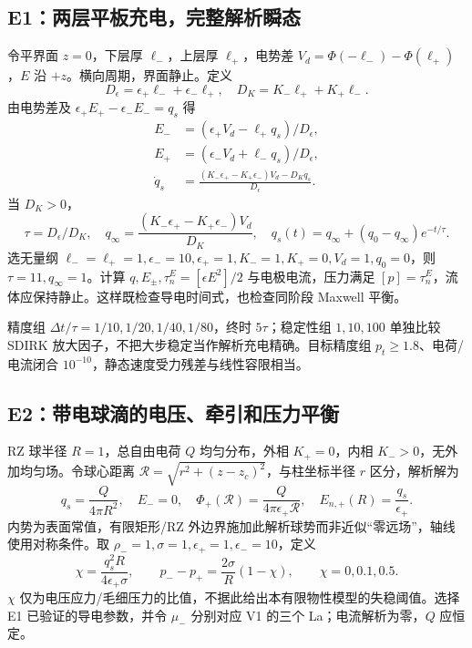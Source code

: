 \documentclass[UTF8,a4paper,11pt,fontset=fandol]{ctexart}
\numberwithin{equation}{section}
\newcommand{\dt}{\Delta t}\newcommand{\dd}{\,\mathrm d}
\begin{document}
\subsection{E1：两层平板充电，完整解析瞬态}
令平界面 $z=0$，下层厚 $\ell_-$，上层厚 $\ell_+$，电势差 $V_d=\Phi(-\ell_-)-\Phi(\ell_+)$，$E$ 沿 $+z$。横向周期，界面静止。定义
\begin{equation}
 D_\epsilon=\epsilon_+\ell_-+\epsilon_-\ell_+,
 \quad D_K=K_-\ell_++K_+\ell_-.
\end{equation}
由电势差及 $\epsilon_+E_+-\epsilon_-E_-=q_s$ 得
\begin{align}
 E_-&=(\epsilon_+V_d-\ell_+q_s)/D_\epsilon,\\
 E_+&=(\epsilon_-V_d+\ell_-q_s)/D_\epsilon,\\
 \dot q_s&=\frac{(K_-\epsilon_+-K_+\epsilon_-)V_d-D_Kq_s}{D_\epsilon}.
\end{align}
当 $D_K>0$，
\begin{equation}
 \tau=D_\epsilon/D_K,\quad
 q_\infty=\frac{(K_-\epsilon_+-K_+\epsilon_-)V_d}{D_K},\quad
 q_s(t)=q_\infty+(q_0-q_\infty)e^{-t/\tau}.
\end{equation}
选无量纲 $\ell_-=\ell_+=1,\epsilon_-=10,\epsilon_+=1,K_-=1,K_+=0,V_d=1,q_0=0$，则 $\tau=11,q_\infty=1$。计算 $q,E_\pm,\tau_n^E=[\epsilon E^2]/2$ 与电极电流，压力满足 $[p]=\tau_n^E$，流体应保持静止。这样既检查导电时间式，也检查同阶段 Maxwell 平衡。

精度组 $\dt/\tau=1/10,1/20,1/40,1/80$，终时 $5\tau$；稳定性组 $1,10,100$ 单独比较 SDIRK 放大因子，不把大步稳定当作解析充电精确。目标精度组 $p_t\ge1.8$、电荷/电流闭合 $10^{-10}$，静态速度受力残差与线性容限相当。

\subsection{E2：带电球滴的电压、牵引和压力平衡}
RZ 球半径 $R=1$，总自由电荷 $Q$ 均匀分布，外相 $K_+=0$，内相 $K_->0$，无外加均匀场。令球心距离 $\mathcal R=\sqrt{r^2+(z-z_c)^2}$，与柱坐标半径 $r$ 区分，解析解为
\begin{equation}
 q_s=\frac{Q}{4\pi R^2},\quad E_-=0,\quad
 \Phi_+(\mathcal R)=\frac{Q}{4\pi\epsilon_+\mathcal R},\quad
 E_{n,+}(R)=\frac{q_s}{\epsilon_+}.
\end{equation}
内势为表面常值，有限矩形/RZ 外边界施加此解析球势而非近似“零远场”，轴线使用对称条件。取 $\rho_-=1,\sigma=1,\epsilon_+=1,\epsilon_-=10$，定义
\begin{equation}
 \chi=\frac{q_s^2R}{4\epsilon_+\sigma},\qquad
 p_--p_+=\frac{2\sigma}{R}(1-\chi),\qquad\chi=0,0.1,0.5.
\end{equation}
$\chi$ 仅为电压应力/毛细压力的比值，不据此给出本有限物性模型的失稳阈值。选择 E1 已验证的导电参数，并令 $\mu_-$ 分别对应 V1 的三个 La；电流解析为零，$Q$ 应恒定。
\end{document}
